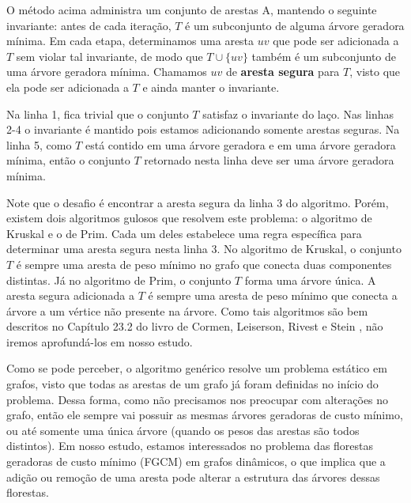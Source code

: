 O método acima administra um conjunto de arestas A, mantendo o seguinte invariante: antes de cada iteração, $T$ é um subconjunto de alguma árvore geradora mínima. Em cada etapa, determinamos uma aresta $uv$ que pode ser adicionada a $T$ sem violar tal invariante, de modo que $T \cup \{uv\}$ também é um subconjunto de uma árvore geradora mínima. Chamamos $uv$ de \textbf{aresta segura} para $T$, visto que ela pode ser adicionada a $T$ e ainda manter o invariante. 

Na linha 1, fica trivial que o conjunto $T$ satisfaz o invariante do laço. Nas linhas 2-4 o invariante é mantido pois estamos adicionando somente arestas seguras. Na linha 5, como $T$ está contido em uma árvore geradora e em uma árvore geradora mínima, então o conjunto $T$ retornado nesta linha deve ser uma árvore geradora mínima. 

Note que o desafio é encontrar a aresta segura da linha 3 do algoritmo. Porém, existem dois algoritmos gulosos que resolvem este problema: o algoritmo de Kruskal e o de Prim. Cada um deles estabelece uma regra específica para determinar uma aresta segura nesta linha 3. No algoritmo de Kruskal, o conjunto $T$ é sempre uma aresta de peso mínimo no grafo que conecta duas componentes distintas. Já no algoritmo de Prim, o conjunto $T$ forma uma árvore única. A aresta segura adicionada a $T$ é sempre uma aresta de peso mínimo que conecta a árvore a um vértice não presente na árvore. Como tais algoritmos são bem descritos no Capítulo 23.2 do livro de Cormen, Leiserson, Rivest e Stein \cite{clrs}, não iremos aprofundá-los em nosso estudo. 

Como se pode perceber, o algoritmo genérico resolve um problema estático em grafos, visto que todas as arestas de um grafo já foram definidas no início do problema. Dessa forma, como não precisamos nos preocupar com alterações no grafo, então ele sempre vai possuir as mesmas árvores geradoras de custo mínimo, ou até somente uma única árvore (quando os pesos das arestas são todos distintos). Em nosso estudo, estamos interessados no problema das florestas geradoras de custo mínimo (FGCM) em grafos dinâmicos, o que implica que a adição ou remoção de uma aresta pode alterar a estrutura das árvores dessas florestas.

